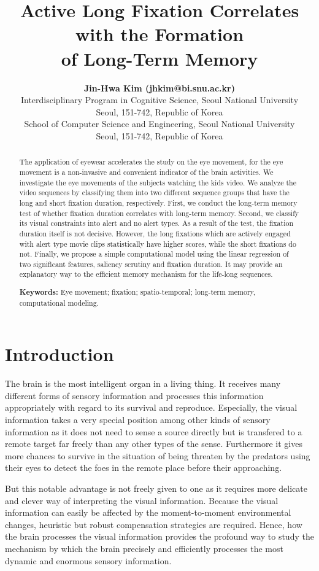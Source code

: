 \documentclass[10pt,letterpaper]{article}
\title{Active Long Fixation Correlates with the Formation \\
of Long-Term Memory}
\author{{\large \bf Jin-Hwa Kim (jhkim@bi.snu.ac.kr)} \\
  Interdisciplinary Program in Cognitive Science, Seoul National University \\
  Seoul, 151-742, Republic of Korea
  \AND {\large \bf Byoung-Tak Zhang (btzhang@bi.snu.ac.kr)} \\
  School of Computer Science and Engineering, Seoul National University \\
  Seoul, 151-742, Republic of Korea}
\begin{document}
\maketitle

\begin{abstract}
The application of eyewear accelerates the study on the eye movement, for the eye movement is a non-invasive and convenient indicator of the brain activities. We investigate the eye movements of the subjects watching the kids video. We analyze the video sequences by classifying them into two different sequence groups that have the long and short fixation duration, respectively. First, we conduct the long-term memory test of whether fixation duration correlates with long-term memory. Second, we classify its visual constraints into alert and no alert types. As a result of the test, the fixation duration itself is not decisive. However, the long fixations which are actively engaged with alert type movie clips statistically have higher scores, while the short fixations do not. Finally, we propose a simple computational model using the linear regression of two significant features, saliency scrutiny and fixation duration. It may provide an explanatory way to the efficient memory mechanism for the life-long sequences.

\textbf{Keywords:} 
Eye movement; fixation; spatio-temporal; long-term memory, computational modeling.
\end{abstract}



\section{Introduction}

The brain is the most intelligent organ in a living thing. It receives many different forms of sensory information and processes this information appropriately with regard to its survival and reproduce. Especially, the visual information takes a very special position among other kinds of sensory information as it does not need to sense a source directly but is transfered to a remote target far freely than any other types of the sense. Furthermore it gives more chances to survive in the situation of being threaten by the predators using their eyes to detect the foes in the remote place before their approaching. 

But this notable advantage is not freely given to one as it requires more delicate and clever way of interpreting the visual information. Because the visual information can easily be affected by the moment-to-moment environmental changes, heuristic but robust compensation strategies are required. Hence, how the brain processes the visual information provides the profound way to study the mechanism by which the brain precisely and efficiently processes the most dynamic and enormous sensory information.
\end{document}
